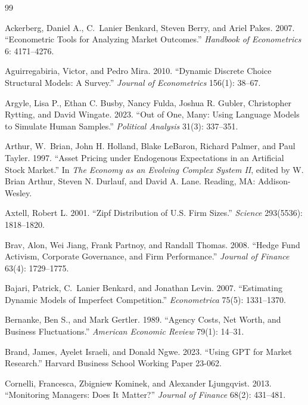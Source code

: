 \documentclass[11pt]{article}
\begin{document}

\begin{thebibliography}{99}

Ackerberg, Daniel A., C.~Lanier Benkard, Steven Berry, and Ariel Pakes.
2007. ``Econometric Tools for Analyzing Market Outcomes.''
\textit{Handbook of Econometrics} 6: 4171--4276.

Aguirregabiria, Victor, and Pedro Mira. 2010. ``Dynamic Discrete Choice
Structural Models: A Survey.'' \textit{Journal of Econometrics} 156(1):
38--67.

Argyle, Lisa P., Ethan C. Busby, Nancy Fulda, Joshua R. Gubler,
Christopher Rytting, and David Wingate. 2023. ``Out of One, Many:
Using Language Models to Simulate Human Samples.''
\textit{Political Analysis} 31(3): 337--351.

Arthur, W.~Brian, John H. Holland, Blake LeBaron, Richard Palmer, and
Paul Tayler. 1997. ``Asset Pricing under Endogenous Expectations in an
Artificial Stock Market.'' In \textit{The Economy as an Evolving
Complex System II}, edited by W. Brian Arthur, Steven N. Durlauf, and
David A. Lane. Reading, MA: Addison-Wesley.

Axtell, Robert L. 2001. ``Zipf Distribution of U.S. Firm Sizes.''
\textit{Science} 293(5536): 1818--1820.

Brav, Alon, Wei Jiang, Frank Partnoy, and Randall Thomas. 2008.
``Hedge Fund Activism, Corporate Governance, and Firm Performance.''
\textit{Journal of Finance} 63(4): 1729--1775.

Bajari, Patrick, C.~Lanier Benkard, and Jonathan Levin. 2007. ``Estimating
Dynamic Models of Imperfect Competition.'' \textit{Econometrica} 75(5):
1331--1370.

Bernanke, Ben S., and Mark Gertler. 1989. ``Agency Costs, Net Worth,
and Business Fluctuations.'' \textit{American Economic Review} 79(1):
14--31.

Brand, James, Ayelet Israeli, and Donald Ngwe. 2023. ``Using GPT for
Market Research.'' Harvard Business School Working Paper 23-062.

Cornelli, Francesca, Zbigniew Kominek, and Alexander Ljungqvist.
2013. ``Monitoring Managers: Does It Matter?'' \textit{Journal of
Finance} 68(2): 431--481.


\end{thebibliography}
\end{document}
